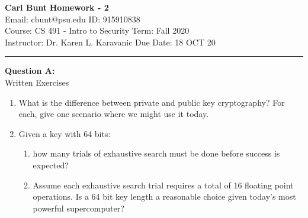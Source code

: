 \documentclass[a4paper, 11pt]{article}
\newenvironment{problem}[2][Question]
               { \begin{mdframed}[backgroundcolor=gray!20] \textbf{#1 #2:} \\}
               {   \end{mdframed}}
\begin{document}
 \noindent
 \large\textbf{Carl Bunt} \hfill \textbf{Homework - 2}   \\
 Email: cbunt@psu.edu \hfill ID: 915910838 \\
 \normalsize Course: CS 491 - Intro to Security \hfill Term: Fall 2020\\
 Instructor: Dr. Karen L. Karavanic \hfill Due Date: 18 OCT 20\\
 \noindent\rule{7in}{2.8pt}

 \begin{problem}{A}
   Written Exercises \\
   \begin{enumerate}[label=\arabic*.]
   \item
     What is the difference between private and public key cryptography? For each, give one scenario where we might use it today.
     
   \item
     Given a key with 64 bits:
     \begin{enumerate}[label=\alph*.]  
     \item
       how many trials of exhaustive search must be done before success is expected?
     \item
       Assume each exhaustive search trial requires a total of 16 floating point operations. Is a 64 bit key length a reasonable choice given today's most powerful supercomputer?
     \end{enumerate}
   \end{enumerate}
 \end{problem}
\end{document}
